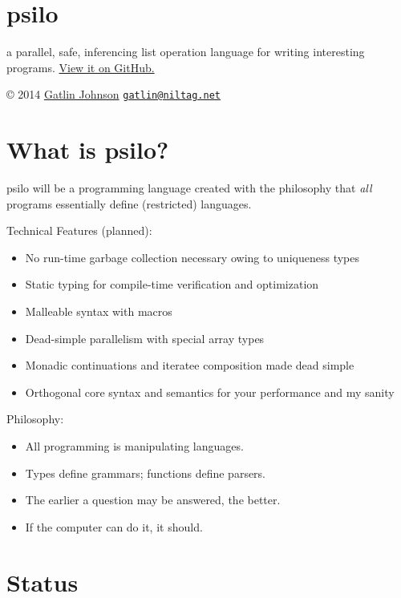 \documentclass[]{article}
\date{}
\begin{document}
\section{psilo}\label{psilo}

a parallel, safe, inferencing list operation language for writing
interesting programs. \href{https://github.com/gatlin/psilo}{View it on
GitHub.}

© 2014 \href{http://niltag.net}{Gatlin Johnson}
\href{mailto:gatlin@niltag.net}{\nolinkurl{gatlin@niltag.net}}

\section{What is psilo?}\label{what-is-psilo}

psilo will be a programming language created with the philosophy that
\emph{all} programs essentially define (restricted) languages.

Technical Features (planned):

\begin{itemize}
\itemsep1pt\parskip0pt
\item
  No run-time garbage collection necessary owing to uniqueness types
\item
  Static typing for compile-time verification and optimization
\item
  Malleable syntax with macros
\item
  Dead-simple parallelism with special array types
\item
  Monadic continuations and iteratee composition made dead simple
\item
  Orthogonal core syntax and semantics for your performance and my
  sanity
\end{itemize}

Philosophy:

\begin{itemize}
\itemsep1pt\parskip0pt
\item
  All programming is manipulating languages.
\item
  Types define grammars; functions define parsers.
\item
  The earlier a question may be answered, the better.
\item
  If the computer can do it, it should.
\end{itemize}

\section{Status}\label{status}
\end{document}
